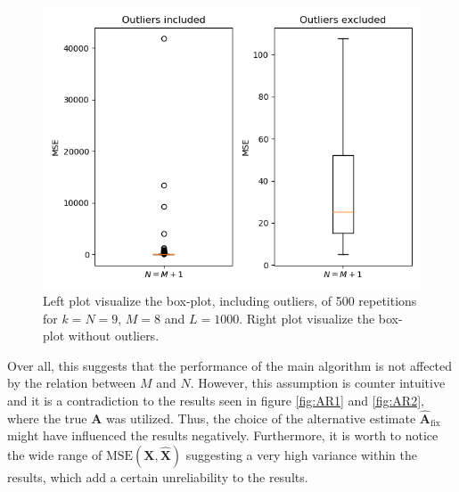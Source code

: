 \begin{figure}[H]
    \centering
	\includegraphics[scale=0.5]{figures/ch_6/boxplot.png}
	\caption{Left plot visualize the box-plot, including outliers, of 500 repetitions for $k=N=9$, $M=8$ and $L=1000$. Right plot visualize the box-plot without outliers.}
	\label{fig:box}
\end{figure}
\noindent 
Over all, this suggests that the performance of the main algorithm is not affected by the relation between $M$ and $N$.
However, this assumption is counter intuitive and it is a contradiction to the results seen in figure \ref{fig:AR1} and \ref{fig:AR2}, where the true $\mathbf{A}$ was utilized. 
Thus, the choice of the alternative estimate $\hat{\mathbf{A}}_{\text{fix}}$ might have influenced the results negatively. 
Furthermore, it is worth to notice the wide range of $\text{MSE}(\mathbf{X}, \hat{\mathbf{X}})$ suggesting a very high variance within the results, which add a certain unreliability to the results.    